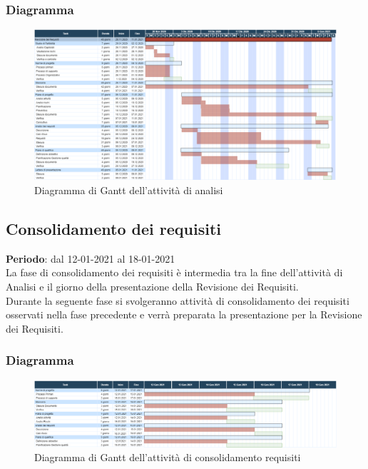 	\subsubsection{Diagramma}
		\begin{figure}[H]
        		\centering
        		\includegraphics[width=\textwidth]{source/img/analisiattivita.png}
        		\caption{Diagramma di Gantt dell'attività di analisi}
    		\end{figure}

	\subsection{Consolidamento dei requisiti}
	\textbf{Periodo}: dal 12-01-2021 al 18-01-2021 \\
	La fase di consolidamento dei requisiti è intermedia tra la fine dell'attività di Analisi e il giorno della presentazione della Revisione dei Requisiti. \\
	Durante la seguente fase si svolgeranno attività di consolidamento dei requisiti osservati nella fase precedente e verrà preparata la presentazione per la Revisione dei Requisiti.
	
	\subsubsection{Diagramma}
		\begin{figure}[H]
        		\centering
        		\includegraphics[width=\textwidth]{source/img/Consolidamento_Requisiti.png}
        		\caption{Diagramma di Gantt dell'attività di consolidamento requisiti}
    		\end{figure}
	
